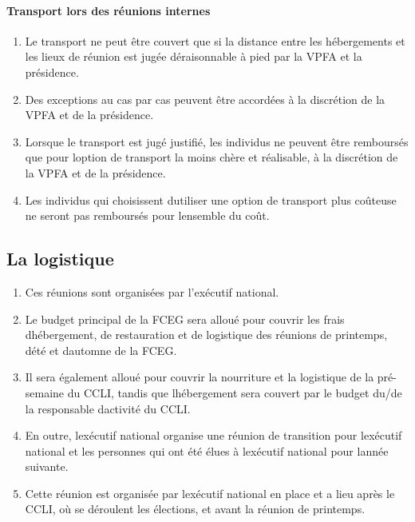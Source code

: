 \paragraph{Transport lors des réunions internes}
\begin{enumerate}
 \item
  Le transport ne peut être couvert que si la distance entre les hébergements et les lieux de réunion est jugée déraisonnable à pied par la VPFA et la présidence.
 \item
  Des exceptions au cas par cas peuvent être accordées à la discrétion de la VPFA et de la présidence.
 \item
  Lorsque le transport est jugé justifié, les individus ne peuvent être remboursés que pour l\textquotesingle option de transport la moins chère et réalisable, à la discrétion de la VPFA et de la présidence.
 \item
  Les individus qui choisissent d\textquotesingle utiliser une option de transport plus coûteuse ne seront pas remboursés pour l\textquotesingle ensemble du coût.
\end{enumerate}

\subsection{La logistique}
\label{la-logistique}

\begin{enumerate}
 \item
  Ces réunions sont organisées par l'exécutif national.
 \item
  Le budget principal de la FCEG sera alloué pour couvrir les frais d\textquotesingle hébergement, de restauration et de logistique des réunions de printemps, d\textquotesingle été et d\textquotesingle automne de la FCEG.
 \item
  Il sera également alloué pour couvrir la nourriture et la logistique de la pré-semaine du CCLI, tandis que l\textquotesingle hébergement sera couvert par le budget du/de la responsable d\textquotesingle activité du CCLI.
 \item
  En outre, l\textquotesingle exécutif national organise une réunion de transition pour l\textquotesingle exécutif national et les personnes qui ont été élues à l\textquotesingle exécutif national pour l\textquotesingle année suivante.
 \item
  Cette réunion est organisée par l\textquotesingle exécutif national en place et a lieu après le CCLI, où se déroulent les élections, et avant la réunion de printemps.
\end{enumerate}

